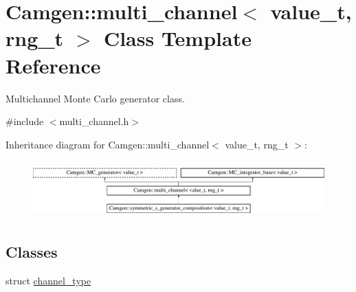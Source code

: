 \hypertarget{a00379}{}\section{Camgen\+:\+:multi\+\_\+channel$<$ value\+\_\+t, rng\+\_\+t $>$ Class Template Reference}
\label{a00379}


Multichannel Monte Carlo generator class.  




{\ttfamily \#include $<$multi\+\_\+channel.\+h$>$}

Inheritance diagram for Camgen\+:\+:multi\+\_\+channel$<$ value\+\_\+t, rng\+\_\+t $>$\+:\begin{figure}[H]
\begin{center}
\leavevmode
\includegraphics[height=2.216359cm]{a00379}
\end{center}
\end{figure}
\subsection*{Classes}
\begin{DoxyCompactItemize}
\item 
struct \hyperlink{a00061}{channel\+\_\+type}
\end{DoxyCompactItemize}
